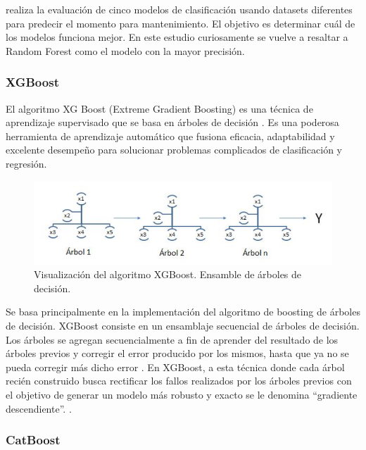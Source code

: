 \documentclass[11pt,a4paper,spanish]{book}
\numberwithin{equation}{chapter}
\numberwithin{figure}{chapter}
\begin{document}
\cite{sharma2022predictive} realiza la evaluación de cinco modelos de clasificación usando datasets diferentes para predecir el momento para mantenimiento. El objetivo es determinar cuál de los modelos funciona mejor. En este estudio curiosamente se vuelve a resaltar a Random Forest como el modelo con la mayor precisión.


\subsubsection{XGBoost}

El algoritmo XG Boost (Extreme Gradient Boosting) es una técnica de aprendizaje supervisado que se basa en árboles de decisión \cite{chen2016xgboost}.  Es una poderosa herramienta de aprendizaje automático que fusiona eficacia, adaptabilidad y excelente desempeño para solucionar problemas complicados de clasificación y regresión. 

\begin{figure}[h]
    \centering
    \includegraphics[width=1.0\textwidth]{media/xgboost-salman.png}
    \caption{Visualización del algoritmo XGBoost. Ensamble de árboles de decisión.  \protect\cite{salman2024rf} }
    \label{fig:figXGBoostSalman}
\end{figure}


Se basa principalmente en la implementación del algoritmo de boosting de árboles de decisión. XGBoost consiste en un ensamblaje secuencial de árboles de decisión. Los árboles se agregan secuencialmente a fin de aprender del resultado de los árboles previos y corregir el error producido por los mismos, hasta que ya no se pueda corregir más dicho error \cite{salman2024rf}.  En XGBoost, a esta técnica donde cada árbol recién construido busca rectificar los fallos realizados por los árboles previos con el objetivo de generar un modelo más robusto y exacto se le denomina “gradiente descendiente”. \cite{espinoza2020rf_xgboost}.

\subsubsection{CatBoost}
\end{document}
